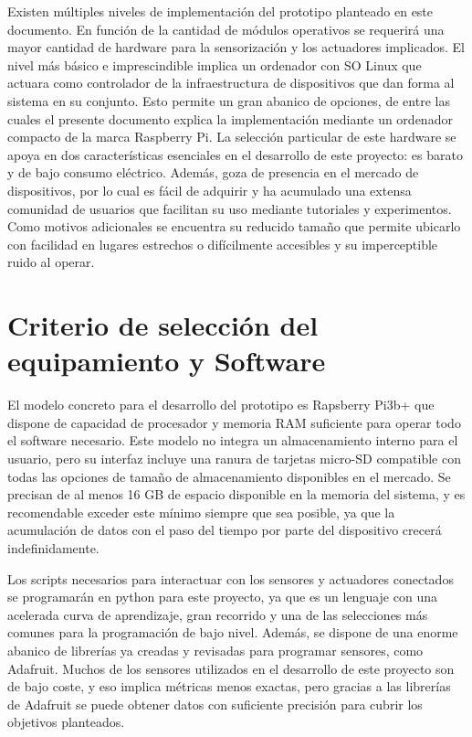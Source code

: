 Existen múltiples niveles de implementación del prototipo planteado en este documento. En función de la cantidad de módulos operativos se requerirá una mayor cantidad de hardware para la sensorización y los actuadores implicados. El nivel más básico e imprescindible implica un ordenador con SO Linux que actuara como controlador de la infraestructura de dispositivos que dan forma al sistema en su conjunto. Esto permite un gran abanico de opciones, de entre las cuales el presente documento explica la implementación mediante un ordenador compacto de la marca Raspberry Pi. La selección particular de este hardware se apoya en dos características esenciales en el desarrollo de este proyecto: es barato y de bajo consumo eléctrico. Además, goza de presencia en el mercado de dispositivos, por lo cual es fácil de adquirir y ha acumulado una extensa comunidad de usuarios que facilitan su uso mediante tutoriales y experimentos. Como motivos adicionales se encuentra su reducido tamaño que permite ubicarlo con facilidad en lugares estrechos o difícilmente accesibles y su imperceptible ruido al operar.

\section{Criterio de selección del equipamiento y Software}
\label{makereference1.4}
El modelo concreto para el desarrollo del prototipo es Rapsberry Pi3b+ que dispone de capacidad de procesador y memoria RAM suficiente para operar todo el software necesario. Este modelo no integra un almacenamiento interno para el usuario, pero su interfaz incluye una ranura de tarjetas micro-SD compatible con todas las opciones de tamaño de almacenamiento disponibles en el mercado. Se precisan de al menos 16 GB de espacio disponible en la memoria del sistema, y es recomendable exceder este mínimo siempre que sea posible, ya que la acumulación de datos con el paso del tiempo por parte del dispositivo crecerá indefinidamente.

Los scripts necesarios para interactuar con los sensores y actuadores conectados se programarán en python para este proyecto, ya que es un lenguaje con una acelerada curva de aprendizaje, gran recorrido y una de las selecciones más comunes para la programación de bajo nivel. Además, se dispone de una enorme abanico de librerías ya creadas y revisadas para programar sensores, como Adafruit. Muchos de los sensores utilizados en el desarrollo de este proyecto son de bajo coste, y eso implica métricas menos exactas, pero gracias a las librerías de Adafruit se puede obtener datos con suficiente precisión para cubrir los objetivos planteados.


